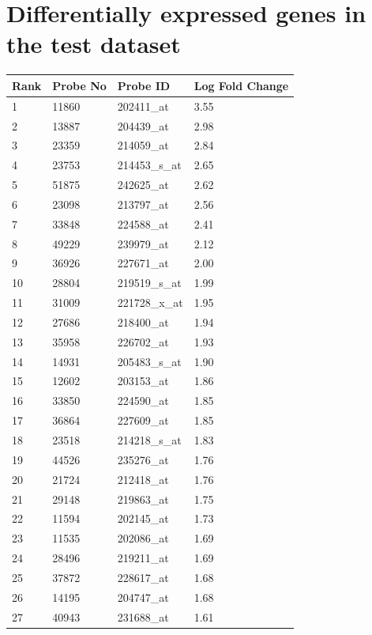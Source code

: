 \documentclass[a4paper, 12pt]{report}
\begin{document}
\newpage
\section{Differentially expressed genes in the test dataset}


\begin{footnotesize}
\begin{longtable}{|>{}m{1cm} |>{}m{2cm} | >{}m{5cm}| >{}m{4cm} | }
  \hline
\textbf{Rank} & \textbf{Probe No} & \textbf{Probe ID} & \textbf{Log Fold Change}  \\ \hline
1 & 11860 & 202411\_at & 3.55 \\ 
  2 & 13887 & 204439\_at & 2.98 \\ 
  3 & 23359 & 214059\_at & 2.84 \\ 
  4 & 23753 & 214453\_s\_at & 2.65 \\ 
  5 & 51875 & 242625\_at & 2.62 \\ 
  6 & 23098 & 213797\_at & 2.56 \\ 
  7 & 33848 & 224588\_at & 2.41 \\ 
  8 & 49229 & 239979\_at & 2.12 \\ 
  9 & 36926 & 227671\_at & 2.00 \\ 
  10 & 28804 & 219519\_s\_at & 1.99 \\ 
  11 & 31009 & 221728\_x\_at & 1.95 \\ 
  12 & 27686 & 218400\_at & 1.94 \\ 
  13 & 35958 & 226702\_at & 1.93 \\ 
  14 & 14931 & 205483\_s\_at & 1.90 \\ 
  15 & 12602 & 203153\_at & 1.86 \\ 
  16 & 33850 & 224590\_at & 1.85 \\ 
  17 & 36864 & 227609\_at & 1.85 \\ 
  18 & 23518 & 214218\_s\_at & 1.83 \\ 
  19 & 44526 & 235276\_at & 1.76 \\ 
  20 & 21724 & 212418\_at & 1.76 \\ 
  21 & 29148 & 219863\_at & 1.75 \\ 
  22 & 11594 & 202145\_at & 1.73 \\ 
  23 & 11535 & 202086\_at & 1.69 \\ 
  24 & 28496 & 219211\_at & 1.69 \\ 
  25 & 37872 & 228617\_at & 1.68 \\ 
  26 & 14195 & 204747\_at & 1.68 \\ 
  27 & 40943 & 231688\_at & 1.61 \\ 

\end{longtable}
\end{footnotesize}
\end{document}
